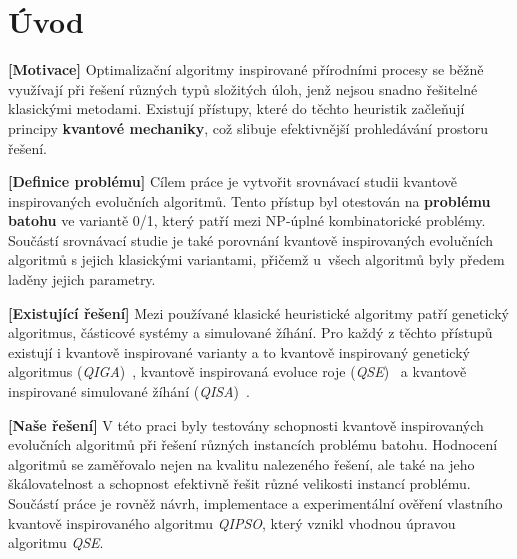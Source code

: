 \documentclass[czech]{ExcelAtFIT} %
\affiliation{*%
  \href{mailto:xbartu11@stud.fit.vutbr.cz}{xbartu11@stud.fit.vutbr.cz},
  \textit{Faculty of Information Technology, Brno University of Technology}}
\begin{document}
\startdocument


\section{Úvod}

\textbf{[Motivace]}
Optimalizační algoritmy inspirované přírodními procesy se běžně využívají při řešení různých typů složitých úloh, jenž nejsou snadno řešitelné klasickými metodami. 
Existují přístupy, které do těchto heuristik začleňují principy \textbf{kvantové mechaniky}, což slibuje efektivnější prohledávání prostoru řešení.

\textbf{[Definice problému]}
Cílem práce je vytvořit srovnávací studii kvantově inspirovaných evolučních algoritmů. 
Tento přístup byl otestován na \textbf{problému batohu} ve variantě 0/1, který patří mezi NP-úplné kombinatorické problémy. 
Součástí srovnávací studie je také porovnání kvantově inspirovaných evolučních algoritmů s jejich klasickými variantami, přičemž u~všech algoritmů byly předem laděny jejich parametry. 

\textbf{[Existující řešení]}
Mezi používané klasické heuristické algoritmy patří genetický algoritmus, částicové systémy a simulované žíhání. 
Pro každý z těchto přístupů existují i kvantově inspirované varianty a to kvantově inspirovaný genetický algoritmus (\emph{QIGA})~\cite{qiga}, kvantově inspirovaná evoluce roje (\emph{QSE})~\cite{qse} a kvantově inspirované simulované žíhání (\emph{QISA})~\cite{qisa}.

\textbf{[Naše řešení]}
V této praci byly testovány schopnosti kvantově inspirovaných evolučních algoritmů při řešení různých instancích problému batohu. 
Hodnocení algoritmů se zaměřovalo nejen na kvalitu nalezeného řešení, ale také na jeho škálovatelnost a schopnost efektivně řešit různé velikosti instancí problému. 
Součástí práce je rovněž návrh, implementace a experimentální ověření vlastního kvantově inspirovaného algoritmu \emph{QIPSO}, který vznikl vhodnou úpravou algoritmu \emph{QSE}.

\end{document}
